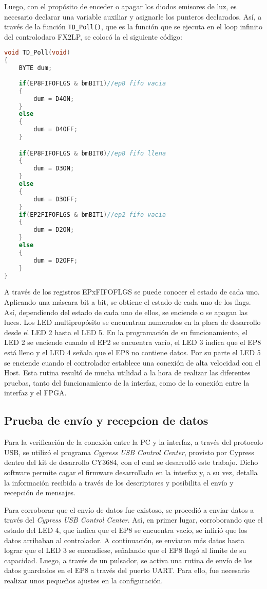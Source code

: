 Luego, con el propósito de enceder o apagar los diodos emisores de luz, es necesario declarar una variable auxiliar y asignarle los punteros declarados. Así, a través de la función \verb|TD_Poll()|, que es la función que se ejecuta en el loop infinito del controlodaro FX2LP, se colocó la el siguiente código:

	\begin{lstlisting}[language=C,backgroundcolor=\color{gray!30}]
void TD_Poll(void)  
{
	BYTE dum;
	
	if(EP8FIFOFLGS & bmBIT1)//ep8 fifo vacia
	{
		dum = D4ON;
	}
	else
	{
		dum = D4OFF;
	}

	if(EP8FIFOFLGS & bmBIT0)//ep8 fifo llena
	{
		dum = D3ON;
	}
	else
	{
		dum = D3OFF;
	}
	if(EP2FIFOFLGS & bmBIT1)//ep2 fifo vacia
	{
		dum = D2ON;
	}
	else
	{
		dum = D2OFF;
	}
}
	\end{lstlisting}

A través de los registros EPxFIFOFLGS se puede conocer el estado de cada uno. Aplicando una máscara bit a bit, se obtiene el estado de cada uno de los flags. Así, dependiendo del estado de cada uno de ellos, se enciende o se apagan las luces.
Los LED multipropósito se encuentran numerados en la placa de desarrollo desde el LED 2 hasta el LED 5. En la programación de su funcionamiento, el LED 2 se enciende cuando el EP2 se encuentra vacío, el LED 3 indica que el EP8 está lleno y el LED 4 señala que el EP8 no contiene datos. Por su parte el LED 5 se enciende cuando el controlador establece una conexión de alta velocidad con el Host. 
Esta rutina resultó de mucha utilidad a la hora de realizar las diferentes pruebas, tanto del funcionamiento de la interfaz, como de la conexión entre la interfaz y el FPGA.

\subsection{Prueba de envío y recepcion de datos}
	Para la verificación de la conexión entre la PC y la interfaz, a través del protocolo USB, se utilizó el programa {\it Cypress USB Control Center}, provisto por Cypress dentro del kit de desarrollo CY3684, con el cual se desarrolló este trabajo. Dicho software permite cagar el firmware desarrollado en la interfaz y, a su vez, detalla la información recibida a través de los descriptores y posibilita el envío y recepción de mensajes.
	
	Para corroborar que el envío de datos fue existoso, se procedió a enviar datos a través del {\it Cypress USB Control Center}. Así, en primer lugar, corroborando que el estado del LED 4, que indica que el EP8 se encuentra vacío, se infirió que los datos arribaban al controlador. A continuación, se enviaron más datos hasta lograr que el LED 3 se encendiese, señalando que el EP8 llegó al límite de su capacidad. Luego, a través de un pulsador, se activa una rutina de envío de los datos guardados en el EP8 a través del puerto UART. Para ello, fue necesario realizar unos pequeños ajustes en la configuración.
	
